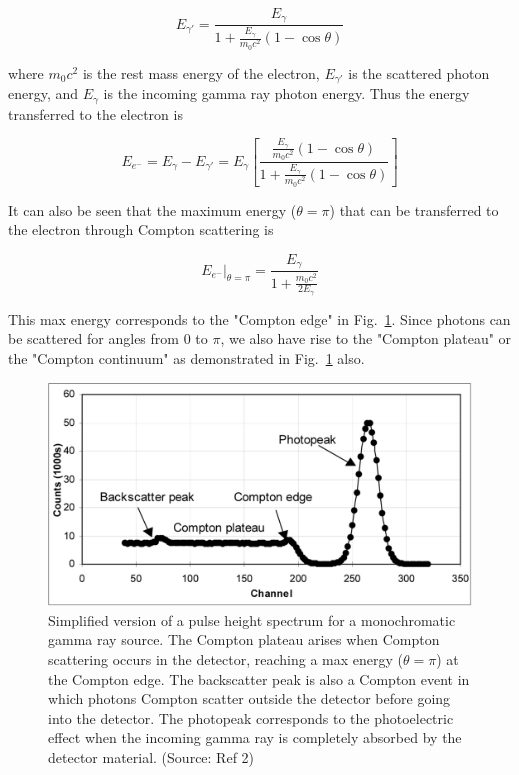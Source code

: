 \documentclass[%
 aip,
rsi,%
 amsmath,amssymb,
 reprint,%
author-numerical,%
]{revtex4-1}
\begin{document}
\begin{equation}
E_{\gamma \prime} = \frac {E_{\gamma}} { 1 + \frac { E_{\gamma} } { m _ { 0 } c ^ { 2 } } ( 1 - \cos \theta ) }
\label{eq:two}
\end{equation}

\noindent where $m _ { 0 } c ^ { 2 }$ is the rest mass energy of the electron, $E_{\gamma \prime} $ is the scattered photon energy, and $E_{\gamma}$ is the incoming gamma ray photon energy. Thus the energy transferred to the electron is 

\begin{equation}
E _ { e ^ { - } } = E_{\gamma} - E_{\gamma \prime} = E_{\gamma}[ \frac { \frac { E_{\gamma}} { m _ { 0 } c ^ { 2 } } ( 1 - \cos \theta ) } { 1 + \frac { E_{\gamma}} { m _ { 0} c ^ { 2 }} ( 1 - \cos \theta ) } ]
\label{eq:three}
\end{equation}

It can also be seen that the maximum energy  ($\theta=\pi$)  that can be transferred to the electron through Compton scattering is 

\begin{equation}
 E _ { e ^ { - } } | _ { \theta = \pi } = \frac { E_{\gamma} } { 1 + \frac{ m _ { 0 } c ^ { 2 }} {2E_{\gamma} }} 
 \label{eq:four}
\end{equation}

This max energy corresponds to the "Compton edge" in Fig.~\ref{fig:compton}. Since photons can be scattered for angles from 0 to $\pi$, we also have rise to the "Compton plateau" or the "Compton continuum" as demonstrated in Fig.~\ref{fig:compton} also. 

\begin{figure}
\includegraphics[width=0.6\linewidth]{lateximages/Spectra.png} 
\caption{\label{fig:compton}  Simplified version of a pulse height spectrum for a monochromatic gamma ray source. The Compton plateau arises when Compton scattering occurs in the detector, reaching a max energy ($\theta=\pi$) at the Compton edge. The backscatter peak is also a Compton event in which photons Compton scatter outside the detector before going into the detector. The photopeak corresponds to the photoelectric effect when the incoming gamma ray is completely absorbed by the detector material. (Source: Ref 2)}
\end{figure}
\end{document}
